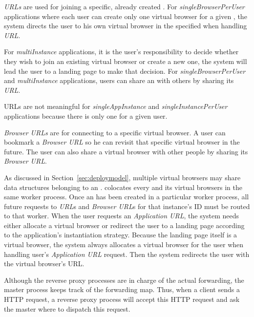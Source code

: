 \landingpagefig{}


\emph{\appins{} URLs} are used for joining a specific, already created
\appins{}.   For \emph{singleBrowserPerUser} applications where each user can
create only  one virtual browser for a given \appins{}, the system directs the
user to his own virtual browser in the specified \appins{} when handling
\emph{\appins{} URL}.

For \emph{multiInstance} applications, it is the user's responsibility to
decide whether they wish to join an existing virtual browser or create a new
one, the system will lead the user to a landing page to make that decision.
For \emph{singleBrowserPerUser} and \emph{multiInstance} applications, users
can share an \appins{} with others by sharing its \emph{\appins{} URL}.

\appins{} URLs are not meaningful for \emph{singleAppInstance}   and
\emph{singleInstancePerUser} applications because there is only one \appins{}
for a given user.

\emph{Browser URLs} are for connecting to a specific virtual browser. A user
can bookmark a \emph{Browser URL} so he can revisit that specific  virtual
browser in the future. The user can also share a virtual browser with other
people by sharing its \emph{Browser URL}.

As discussed in Section~\ref{sec:deploymodel}, multiple virtual browsers may
share data structures belonging to an \appins{}. \cbtwo colocates every
\appins and its virtual browsers in the same worker process. Once an \appins
has been created in a particular worker process, all future requests to
\emph{\appins{} URL}s and \emph{Browser URL}s for that instance's ID must be
routed to that worker. When the user requests an \emph{Application URL},  the
system needs either allocate  a virtual browser  or redirect the user to a
landing page according to the application's instantiation strategy. Because the
landing page itself is a virtual browser,  the
system always allocates a virtual browser for the  user when handling user's
\emph{Application URL} request. Then the system redirects the user with the
virtual browser's URL.


Although the reverse proxy processes are in charge of the actual forwarding,
the master process keeps track of the forwarding map. Thus,
when a client sends a HTTP request, a reverse proxy process
will accept this HTTP request and ask the master where to dispatch this request. 

